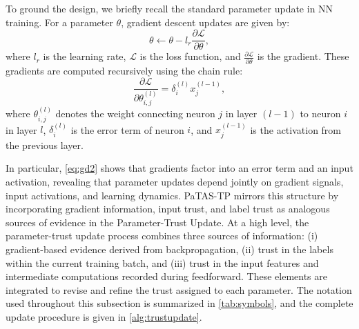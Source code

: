 To ground the design, we briefly recall the standard parameter update in \ac{NN} training. For a parameter $\theta$, gradient descent updates are given by:
\begin{equation}
\label{eq:gd1}
\theta \leftarrow \theta - l_r  \frac{\partial \mathcal{L}}{\partial \theta},
\end{equation}
where $l_r$ is the learning rate, $\mathcal{L}$ is the loss function, and $\frac{\partial \mathcal{L}}{\partial \theta}$ is the gradient. These gradients are computed recursively using the chain rule:
\begin{equation}
\label{eq:gd2}
\frac{\partial \mathcal{L}}{\partial \theta^{(l)}_{i,j}}
= \delta^{(l)}_i x^{(l-1)}_j,
\end{equation}
where $\theta^{(l)}_{i,j}$ denotes the weight connecting neuron $j$ in layer $(l-1)$ to neuron $i$ in layer $l$, $\delta^{(l)}_i$ is the error term of neuron $i$, and $x^{(l-1)}_j$ is the activation from the previous layer.

In particular, \cref{eq:gd2} shows that gradients factor into an error term and an input activation, revealing that parameter updates depend jointly on gradient signals, input activations, and learning dynamics. \ac{PaTAS-TP} mirrors this structure by incorporating gradient information, input trust, and label trust as analogous sources of evidence in the Parameter-Trust Update. At a high level, the parameter-trust update process combines three sources of information: (i) gradient-based evidence derived from backpropagation, (ii) trust in the labels within the current training batch, and (iii) trust in the input features and intermediate computations recorded during feedforward. These elements are integrated to revise and refine the trust assigned to each parameter. The notation used throughout this subsection is summarized in \cref{tab:symbols}, and the complete update procedure is given in \cref{alg:trustupdate}.

